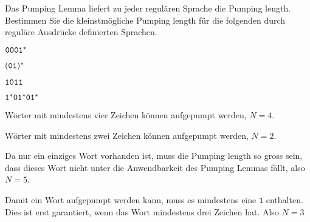 Das Pumping Lemma liefert zu jeder regulären Sprache die Pumping length.
Bestimmen Sie die kleinstmögliche Pumping length für die folgenden
durch reguläre Ausdrücke definierten Sprachen.
\begin{teilaufgaben}
\item ${\tt 0001}^*$
\item $({\tt 01})^*$
\item ${\tt 1011}$
\item ${\tt 1}^*{\tt 01}^*{\tt 01}^*$
\end{teilaufgaben}


\begin{loesung}
\begin{teilaufgaben}
\item Wörter mit mindestens vier Zeichen können aufgepumpt werden,
$N=4$.
\item Wörter mit mindestens zwei Zeichen können aufgepumpt werden,
$N=2$.
\item Da nur ein einziges Wort vorhanden ist, muss die Pumping length
so gross sein, dass dieses Wort nicht unter die Anwendbarkeit des
Pumping Lemmas fällt, also $N=5$.
\item Damit ein Wort aufgepumpt werden kann, muss es mindestens eine
{\tt 1} enthalten. Dies ist erst garantiert, wenn das Wort  mindestens
drei Zeichen hat. Also $N=3$
\qedhere
\end{teilaufgaben}
\end{loesung}
